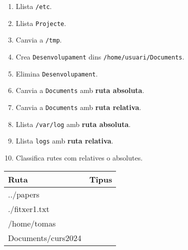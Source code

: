\documentclass[
  12 pt,
  a4paper,
]{article}
\begin{document}
\begin{enumerate}
\item
  Llista \texttt{/etc}.\\
\item
  Llista \texttt{Projecte}.\\
\item
  Canvia a \texttt{/tmp}.\\
\item
  Crea \texttt{Desenvolupament} dins \texttt{/home/usuari/Documents}.\\
\item
  Elimina \texttt{Desenvolupament}.\\
\item
  Canvia a \texttt{Documents} amb \textbf{ruta absoluta}.\\
\item
  Canvia a \texttt{Documents} amb \textbf{ruta relativa}.\\
\item
  Llista \texttt{/var/log} amb \textbf{ruta absoluta}.\\
\item
  Llista \texttt{logs} amb \textbf{ruta relativa}.\\
\item
  Classifica rutes com relatives o absolutes.
\end{enumerate}

\begin{longtable}[]{@{}ll@{}}
\toprule\noalign{}
Ruta & Tipus \\
\midrule\noalign{}
\endhead
\bottomrule\noalign{}
\endlastfoot
../papers & \\
./fitxer1.txt & \\
/home/tomas & \\
Documents/curs2024 & \\
\end{longtable}
\end{document}
